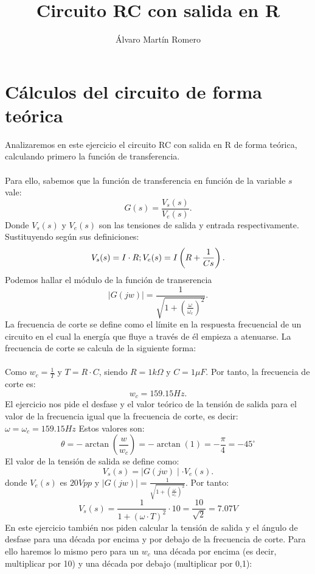 \documentclass[11pt,letterpaper]{article}
\title{Circuito RC con salida en R}
\author{Álvaro Martín Romero}
\begin{document}
\maketitle
\section{Cálculos del circuito de forma teórica}%
\label{sec:Ejercicio 1}
Analizaremos en este ejercicio el circuito RC con salida en R de forma teórica, calculando primero la función de transferencia.\\
\\
Para ello, sabemos que la función de transferencia en función de la variable $s$ vale:
\[
	G(s)=\frac{V_s(s)}{V_e(s)}
.\] 
Donde $V_s(s)$ y $V_e(s)$ son las tensiones de salida y entrada respectivamente. Sustituyendo según sus definiciones:
\[
	V_s(s)=I\cdot R; \\ \\ \\ \\  \\ V_e(s)=I\left( R+\frac{1}{Cs} \right) 
.\] 
Podemos hallar el módulo de la función de transerencia
\[
	\mid G(jw) \mid =\frac{1}{\sqrt{1+\left( \frac{\omega}{\omega_c} \right)^2 }}
.\] 
La frecuencia de corte se define como el límite en la respuesta frecuencial de un circuito en el cual la energía que fluye a través de él empieza a atenuarse. La frecuencia de corte se calcula de la siguiente forma:\\
\\
Como $w_c=\frac{1}{T}$ y $T=R\cdot C$, siendo $R= 1 k\Omega$ y $C=1 \mu F$. Por tanto, la frecuencia de corte es:
\[
w_c=159.15 Hz
.\] 
El ejercicio nos pide el desfase y el valor teórico de la tensión de salida para el valor de la frecuencia igual que la frecuencia de corte, es decir: $\omega=\omega_c=159.15 Hz$ Estos valores son:
\begin{equation}
	\boxed{	\theta= -\arctan \left( \frac{w}{w_c} \right) =-\arctan(1)=-\frac{\pi}{4}=-45^\circ }
\end{equation}
El valor de la tensión de salida se define como:
\[
	V_s(s)= \mid G(jw) \mid \cdot V_e(s)
.\]
donde $V_e(s)$  es $20 Vpp$ y  $ \mid G(jw) \mid =\frac{1}{\sqrt{1+\left( \frac{\omega}{\omega_c} \right) ^2}}$. Por tanto:
\begin{equation}
	\boxed{V_s(s)=\frac{1}{1+\left( \omega\cdot T \right) ^2}\cdot 10=\frac{10}{\sqrt{2} }=7.07 V}
\end{equation}
En este ejercicio también nos piden calcular la tensión de salida y el ángulo de desfase para una década por encima y por debajo de la frecuencia de corte. Para ello haremos lo mismo pero para un $w_c$ una década por encima (es decir, multiplicar por 10) y una década por debajo (multiplicar por 0,1):\\
\end{document}
